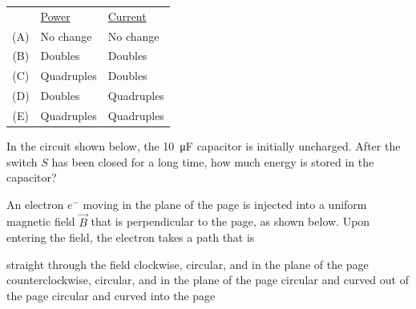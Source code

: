 \documentclass[12pt]{../../../oss-classkick-exam}
\begin{document}
\begin{questions}
  \begin{tabular}{cll}
    & \underline{Power} & \underline{Current}\\
    (A) & No change  & No change \\
    (B) & Doubles    & Doubles   \\
    (C) & Quadruples & Doubles   \\
    (D) & Doubles    & Quadruples\\
    (E) & Quadruples & Quadruples
  \end{tabular}
  \newpage
  
  \question In the circuit shown below, the \SI{10}{\micro\farad} capacitor is
  initially uncharged. After the switch $S$ has been closed for a long time,
  how much energy is stored in the capacitor?

  \begin{minipage}{.4\linewidth}
  \end{minipage}
  \begin{minipage}{.54\linewidth}
  \end{minipage}
  \uplevel{\rule{\linewidth}{.5pt}}
  
  \question An electron $e^-$ moving in the plane of the page is injected into a
  uniform magnetic field $\vec B$ that is perpendicular to the page, as shown
  below. Upon entering the field, the electron takes a path that is

  \vspace{.1in}
  \begin{minipage}{.4\linewidth}
  \end{minipage}
  \begin{minipage}{.55\linewidth}
    \begin{choices}
      \choice straight through the field
      \choice clockwise, circular, and in the plane of the page
      \choice counterclockwise, circular, and in the plane of the page
      \choice circular and curved out of the page
      \choice circular and curved into the page
    \end{choices}
  \end{minipage}
  \vspace{.6in}
  

\end{questions}
\end{document}
